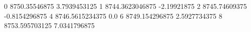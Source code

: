 0 8750.35546875 3.7939453125
1 8744.3623046875 -2.19921875
2 8745.74609375 -0.8154296875
4 8746.5615234375 0.0
6 8749.154296875 2.5927734375
8 8753.595703125 7.0341796875
